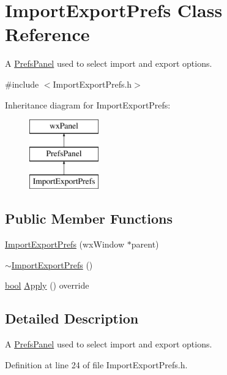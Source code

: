 \hypertarget{class_import_export_prefs}{}\section{Import\+Export\+Prefs Class Reference}
\label{class_import_export_prefs}


A \hyperlink{class_prefs_panel}{Prefs\+Panel} used to select import and export options.  




{\ttfamily \#include $<$Import\+Export\+Prefs.\+h$>$}

Inheritance diagram for Import\+Export\+Prefs\+:\begin{figure}[H]
\begin{center}
\leavevmode
\includegraphics[height=3.000000cm]{class_import_export_prefs}
\end{center}
\end{figure}
\subsection*{Public Member Functions}
\begin{DoxyCompactItemize}
\item 
\hyperlink{class_import_export_prefs_a5d5a82e92432be22c8634fb4d54875c3}{Import\+Export\+Prefs} (wx\+Window $\ast$parent)
\item 
\hyperlink{class_import_export_prefs_a3f090de1b9468b7d418f50f123e9504c}{$\sim$\+Import\+Export\+Prefs} ()
\item 
\hyperlink{mac_2config_2i386_2lib-src_2libsoxr_2soxr-config_8h_abb452686968e48b67397da5f97445f5b}{bool} \hyperlink{class_import_export_prefs_abdc908504c354237be16a12e9fe2c683}{Apply} () override
\end{DoxyCompactItemize}


\subsection{Detailed Description}
A \hyperlink{class_prefs_panel}{Prefs\+Panel} used to select import and export options. 

Definition at line 24 of file Import\+Export\+Prefs.\+h.



